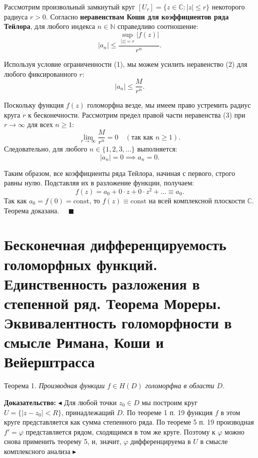 \documentclass[12pt, a4paper]{article}
\theoremstyle{definition}
\theoremstyle{remark}
\begin{document}
Рассмотрим произвольный замкнутый круг $[U_r] = \{z \in \mathbb{C} : |z| \le r\}$ некоторого радиуса $r > 0$. Согласно \textbf{неравенствам Коши для коэффициентов ряда Тейлора}, для любого индекса $n \in \mathbb{N}$ справедливо соотношение:
\begin{equation}
	|a_n| \le \frac{\sup_{|z|=r} |f(z)|}{r^n}.
\end{equation}

Используя условие ограниченности (1), мы можем усилить неравенство (2) для любого фиксированного $r$:
\begin{equation}
	|a_n| \le \frac{M}{r^n}.
\end{equation}

Поскольку функция $f(z)$ голоморфна везде, мы имеем право устремить радиус круга $r$ к бесконечности. Рассмотрим предел правой части неравенства (3) при $r \to \infty$ для всех $n \ge 1$:
\[
\lim_{r \to \infty} \frac{M}{r^n} = 0 \quad (\text{так как } n \ge 1).
\]
Следовательно, для любого $n \in \{1, 2, 3, \dots\}$ выполняется:
\[
|a_n| = 0 \implies a_n = 0.
\]

Таким образом, все коэффициенты ряда Тейлора, начиная с первого, строго равны нулю. Подставляя их в разложение функции, получаем:
\[
f(z) = a_0 + 0 \cdot z + 0 \cdot z^2 + \dots \equiv a_0.
\]
Так как $a_0 = f(0) = \text{const}$, то $f(z) \equiv \text{const}$ на всей комплексной плоскости $\mathbb{C}$. Теорема доказана. $\quad \blacksquare$

\newpage
\section{Бесконечная дифференцируемость голоморфных функций. Единственность разложения в степенной ряд. Теорема Мореры. Эквивалентность голоморфности в смысле Римана, Коши и Вейерштрасса}

Теорема 1. \textit{Производная функции $f \in H(D)$ голоморфна в области $D$.}

\textbf{Доказательство:}
$\blacktriangleleft$ Для любой точки $z_0 \in D$ мы построим круг $U = \{|z - z_0| < R\}$, принадлежащий $D$. По теореме 1 п. 19 функция $f$ в этом круге представляется как сумма степенного ряда. По теореме 5 п. 19 производная $f' = \varphi$ представляется рядом, сходящимся в том же круге. Поэтому к $\varphi$ можно снова применить теорему 5, и, значит, $\varphi$ дифференцируема в $U$ в смысле комплексного анализа $\blacktriangleright$
\end{document}
